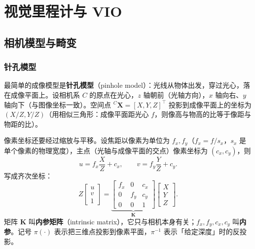 ﻿\chapter{视觉里程计与 VIO}\label{ch:08-visual-odom}


\section{相机模型与畸变}\label{sec:08-camera}

\subsection{针孔模型}

最简单的成像模型是\textbf{针孔模型}（pinhole model）：光线从物体出发，穿过光心，落在成像平面上。设相机系 $C$ 的原点在光心，$z$ 轴朝前（光轴方向），$x$ 轴向右、$y$ 轴向下（与图像坐标一致）。空间点 ${}^{C}\bm{X}=[X,Y,Z]^{\top}$ 投影到成像平面上的坐标为 $(X/Z,Y/Z)$（用相似三角形：成像平面距光心 $f$，则像高与物高的比等于像距与物距的比）。

像素坐标还要经过缩放与平移。设焦距以像素为单位为 $f_x,f_y$（$f_x=f/s_x$，$s_x$ 是单个像素的物理宽度），主点（光轴与成像平面的交点）像素坐标为 $(c_x,c_y)$，则
\begin{equation}
  u = f_x\frac{X}{Z}+c_x,
  \qquad
  v = f_y\frac{Y}{Z}+c_y.
  \label{eq:08-projection}
\end{equation}
写成齐次坐标：
\begin{equation}
  Z\begin{bmatrix}u\\v\\1\end{bmatrix}
  = \underbrace{\begin{bmatrix}
    f_x & 0 & c_x\\
    0 & f_y & c_y\\
    0 & 0 & 1
  \end{bmatrix}}_{\bm{K}}
  \begin{bmatrix}X\\Y\\Z\end{bmatrix}.
  \label{eq:08-K}
\end{equation}
矩阵 $\bm{K}$ 叫\textbf{内参矩阵}（intrinsic matrix），它只与相机本身有关；$f_x,f_y,c_x,c_y$ 叫\textbf{内参}。记号 $\pi(\cdot)$ 表示把三维点投影到像素平面，$\pi^{-1}$ 表示「给定深度」时的反投影。

